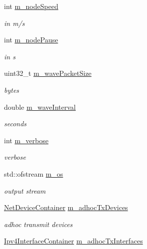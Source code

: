 \begin{DoxyCompactItemize}
int \hyperlink{classVanetRoutingExperiment_a01897ca1cb69ddc7caf328989e0b57ba}{m\+\_\+node\+Speed}
\begin{DoxyCompactList}\small\item\em in m/s \end{DoxyCompactList}\item 
int \hyperlink{classVanetRoutingExperiment_aadb1a32f4804b83f6cc2084432b0514d}{m\+\_\+node\+Pause}
\begin{DoxyCompactList}\small\item\em in s \end{DoxyCompactList}\item 
uint32\+\_\+t \hyperlink{classVanetRoutingExperiment_a9f07935713904851763620de8d879134}{m\+\_\+wave\+Packet\+Size}
\begin{DoxyCompactList}\small\item\em bytes \end{DoxyCompactList}\item 
double \hyperlink{classVanetRoutingExperiment_a273a08aab5e5e9c40b9ce6d51577b640}{m\+\_\+wave\+Interval}
\begin{DoxyCompactList}\small\item\em seconds \end{DoxyCompactList}\item 
int \hyperlink{classVanetRoutingExperiment_a5ac493b7b4acea429be73f407960c7f1}{m\+\_\+verbose}
\begin{DoxyCompactList}\small\item\em verbose \end{DoxyCompactList}\item 
std\+::ofstream \hyperlink{classVanetRoutingExperiment_af25dbb5f928006b27618b65143d1ef2c}{m\+\_\+os}
\begin{DoxyCompactList}\small\item\em output stream \end{DoxyCompactList}\item 
\hyperlink{classns3_1_1NetDeviceContainer}{Net\+Device\+Container} \hyperlink{classVanetRoutingExperiment_a613934ac9ec78c32456236ea6f09aa43}{m\+\_\+adhoc\+Tx\+Devices}
\begin{DoxyCompactList}\small\item\em adhoc transmit devices \end{DoxyCompactList}\item 
\hyperlink{classns3_1_1Ipv4InterfaceContainer}{Ipv4\+Interface\+Container} \hyperlink{classVanetRoutingExperiment_ae87cd0d7f20b0cd7dda83d187938ffd0}{m\+\_\+adhoc\+Tx\+Interfaces}

\end{DoxyCompactItemize}
